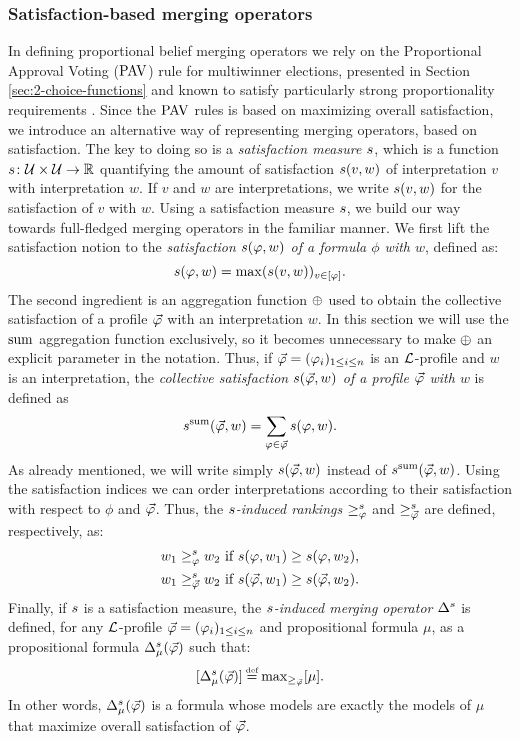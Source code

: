 \subsubsection{Satisfaction-based merging operators}
In defining proportional belief merging operators
we rely on the Proportional Approval Voting ($\pav$) rule
for multiwinner elections, 
presented in Section \ref{sec:2-choice-functions}
and known to satisfy particularly strong proportionality requirements
\cite{AzizBCEFW17}.
Since the $\pav$ rules is based on maximizing overall satisfaction,
we introduce an alternative way of representing merging operators, 
based on satisfaction.
The key to doing so is a \emph{satisfaction measure $\sat$},
which is a function $\sat\colon\U\times\U\rightarrow\mathbb{R}$
quantifying the amount of satisfaction $\sat(v,w)$ of interpretation $v$ with interpretation $w$.
If $v$ and $w$ are interpretations, we write $\sat(v,w)$ for the satisfaction of $v$ with $w$.
Using a satisfaction measure $\sat$,
we build our way towards full-fledged merging operators in the familiar manner.
We first lift the satisfaction notion
to the \emph{satisfaction $\sat(\phi,w)$ of a formula $\phi$ with $w$}, defined as:
$$
\sat(\phi,w)=\max(\sat(v,w))_{v\in[\phi]}.
$$
The second ingredient is an aggregation function $\agg$ used to obtain 
the collective satisfaction of a profile $\P$ with an interpretation $w$.
In this section we will use the $\ssum$ aggregation function exclusively,
so it becomes unnecessary to make $\agg$ an explicit parameter in 
the notation.
Thus, if $\P=(\phi_i)_{1\le i \le n}$ is an $\L$-profile and $w$
is an interpretation,
the \emph{collective satisfaction $\sat(\P,w)$ of a profile $\P$ with $w$} is defined as
$$
\sat^\ssum(\P,w)=\sum_{\phi\in\P}\sat(\phi,w).
$$
As already mentioned, we will write simply $\sat(\P,w)$ instead of $\sat^\ssum(\P,w)$.
Using the satisfaction indices 
we can order interpretations according to their 
satisfaction with respect to $\phi$ and $\P$.
Thus, the \emph{$\sat$-induced rankings $\ge^{\sat}_{\phi}$} and $\ge^{\sat}_{\P}$
are defined, respectively, as:
\begin{align*}
w_1\ge^{\sat}_{\phi}w_2&~\text{if}~\sat(\phi,w_1)\ge\sat(\phi,w_2),\\
w_1\ge^{\sat}_{\P}w_2&~\text{if}~\sat(\P,w_1)\ge\sat(\P,w_2).
\end{align*}
Finally, if $\sat$ is a satisfaction measure,
the \emph{$\sat$-induced merging operator $\me^\sat$} is defined,
for any $\L$-profile $\P=(\phi_i)_{1\le i \le n}$
and propositional formula $\mu$, as a propositional formula $\me^\sat_\mu(\P)$ 
such that:
$$
	\mods{\me^\sat_\mu(\P)}\defeq\max_{\ge_{\P}}[\mu].
$$
In other words, $\me^\sat_\mu(\P)$ is a formula whose 
models are exactly the models of $\mu$ that maximize
overall  satisfaction of $\P$.

